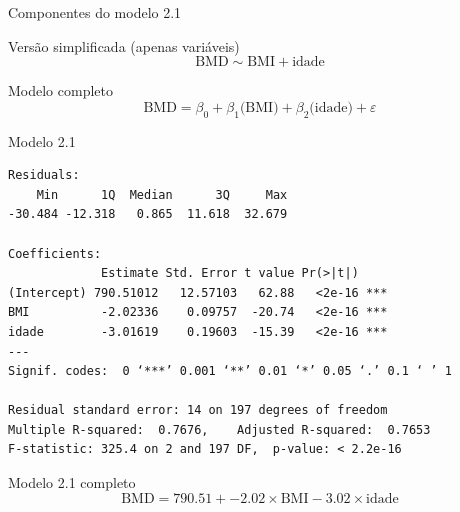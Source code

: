 \documentclass{beamer}
\begin{document}
\begin{frame}{\scriptsize Componentes do modelo 2.1}
  \begin{block}{\footnotesize Versão simplificada (apenas variáveis)}
    \footnotesize
    \begin{displaymath}
      \text{BMD} \sim \text{BMI} + \text{idade}
    \end{displaymath}
  \end{block}
  \bigskip
  \bigskip
  \begin{block}{Modelo completo}
    \footnotesize
    \begin{displaymath}
      \text{BMD} =\beta_0 + \beta_1 \text{(BMI)} + \beta_2 \text{(idade)} +\varepsilon
    \end{displaymath}
  \end{block}
  \vfill
\end{frame}

\begin{frame}[fragile]{\scriptsize }
  \begin{center}
    \begin{exampleblock}{Modelo 2.1}
      \tiny
\begin{verbatim}
Residuals:
    Min      1Q  Median      3Q     Max 
-30.484 -12.318   0.865  11.618  32.679 

Coefficients:
             Estimate Std. Error t value Pr(>|t|)    
(Intercept) 790.51012   12.57103   62.88   <2e-16 ***
BMI          -2.02336    0.09757  -20.74   <2e-16 ***
idade        -3.01619    0.19603  -15.39   <2e-16 ***
---
Signif. codes:  0 ‘***’ 0.001 ‘**’ 0.01 ‘*’ 0.05 ‘.’ 0.1 ‘ ’ 1

Residual standard error: 14 on 197 degrees of freedom
Multiple R-squared:  0.7676,	Adjusted R-squared:  0.7653 
F-statistic: 325.4 on 2 and 197 DF,  p-value: < 2.2e-16
\end{verbatim}
    \end{exampleblock}
  \begin{exampleblock}{Modelo 2.1 completo}
    \footnotesize
    \begin{displaymath}
      \text{BMD} =790.51 + -2.02 \times\text{BMI} -3.02 \times\text{idade}
    \end{displaymath}
  \end{exampleblock}
  \end{center}
\end{frame}
\end{document}
